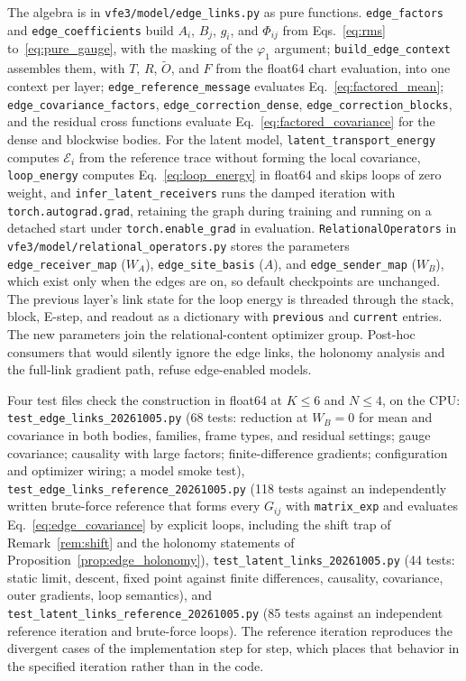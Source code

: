 \documentclass[11pt]{article}
\theoremstyle{definition}
\theoremstyle{remark}
\newcommand{\Ot}{\widetilde O}
\begin{document}
The algebra is in \texttt{vfe3/model/edge\_links.py} as pure functions. \texttt{edge\_factors} and \texttt{edge\_coefficients} build $A_i$, $B_j$, $g_i$, and $\Phi_{ij}$ from Eqs.~\eqref{eq:rms} to~\eqref{eq:pure_gauge}, with the masking of the $\varphi_1$ argument; \texttt{build\_edge\_context} assembles them, with $T$, $R$, $\Ot$, and $F$ from the float64 chart evaluation, into one context per layer; \texttt{edge\_reference\_message} evaluates Eq.~\eqref{eq:factored_mean}; \texttt{edge\_covariance\_factors}, \texttt{edge\_correction\_dense}, \texttt{edge\_correction\_blocks}, and the residual cross functions evaluate Eq.~\eqref{eq:factored_covariance} for the dense and blockwise bodies. For the latent model, \texttt{latent\_transport\_energy} computes $\mathcal E_i$ from the reference trace without forming the local covariance, \texttt{loop\_energy} computes Eq.~\eqref{eq:loop_energy} in float64 and skips loops of zero weight, and \texttt{infer\_latent\_receivers} runs the damped iteration with \texttt{torch.autograd.grad}, retaining the graph during training and running on a detached start under \texttt{torch.enable\_grad} in evaluation. \texttt{RelationalOperators} in \texttt{vfe3/model/relational\_operators.py} stores the parameters \texttt{edge\_receiver\_map} ($W_A$), \texttt{edge\_site\_basis} ($A$), and \texttt{edge\_sender\_map} ($W_B$), which exist only when the edges are on, so default checkpoints are unchanged. The previous layer's link state for the loop energy is threaded through the stack, block, E-step, and readout as a dictionary with \texttt{previous} and \texttt{current} entries. The new parameters join the relational-content optimizer group. Post-hoc consumers that would silently ignore the edge links, the holonomy analysis and the full-link gradient path, refuse edge-enabled models.

Four test files check the construction in float64 at $K\le6$ and $N\le4$, on the CPU: \texttt{test\_edge\_links\_20261005.py} (68 tests: reduction at $W_B=0$ for mean and covariance in both bodies, families, frame types, and residual settings; gauge covariance; causality with large factors; finite-difference gradients; configuration and optimizer wiring; a model smoke test), \texttt{test\_edge\_links\_reference\_20261005.py} (118 tests against an independently written brute-force reference that forms every $G_{ij}$ with \texttt{matrix\_exp} and evaluates Eq.~\eqref{eq:edge_covariance} by explicit loops, including the shift trap of Remark~\ref{rem:shift} and the holonomy statements of Proposition~\ref{prop:edge_holonomy}), \texttt{test\_latent\_links\_20261005.py} (44 tests: static limit, descent, fixed point against finite differences, causality, covariance, outer gradients, loop semantics), and \texttt{test\_latent\_links\_reference\_20261005.py} (85 tests against an independent reference iteration and brute-force loops). The reference iteration reproduces the divergent cases of the implementation step for step, which places that behavior in the specified iteration rather than in the code.
\end{document}
